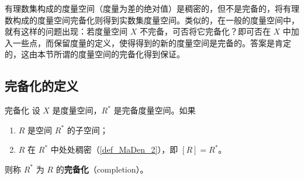 
有理数集构成的度量空间（度量为差的绝对值）是稠密的，但不是完备的，将有理数构成的度量空间完备化则得到实数集度量空间。类似的，在一般的度量空间中，就有这样的问题出现：若度量空间 $X$ 不完备，可否将它完备化？即可否在 $X$ 中加入一些点，而保留度量的定义，使得得到的新的度量空间是完备的。答案是肯定的，这由本节所谓的度量空间的完备化得到保证。

\subsection{完备化的定义}
\begin{definition}{完备化}
设 $X$ 是度量空间，$R^*$ 是完备度量空间。如果
\begin{enumerate}
\item $R$ 是空间 $R^*$ 的子空间；
\item $R$ 在 $R^*$ 中处处稠密（\autoref{def_MaDen_2}），即 $[R]=R^*$。
\end{enumerate}
则称 $R^*$ 为 $R$ 的\textbf{完备化}（completion）。
\end{definition}

